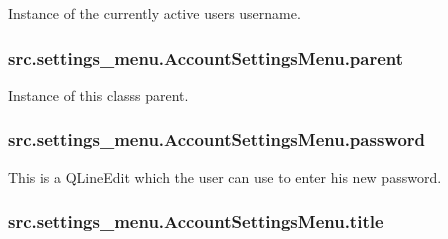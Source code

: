 Instance of the currently active user\textquotesingle{}s username. 

\hypertarget{classsrc_1_1settings__menu_1_1_account_settings_menu_afe50b3829d1054937762620263272c4b}{}
\subsubsection[{parent}]{\setlength{\rightskip}{0pt plus 5cm}src.\+settings\+\_\+menu.\+Account\+Settings\+Menu.\+parent}\label{classsrc_1_1settings__menu_1_1_account_settings_menu_afe50b3829d1054937762620263272c4b}


Instance of this class\textquotesingle{}s parent. 

\hypertarget{classsrc_1_1settings__menu_1_1_account_settings_menu_a11ded2b607c6b7e0b756eef17952b1f6}{}
\subsubsection[{password}]{\setlength{\rightskip}{0pt plus 5cm}src.\+settings\+\_\+menu.\+Account\+Settings\+Menu.\+password}\label{classsrc_1_1settings__menu_1_1_account_settings_menu_a11ded2b607c6b7e0b756eef17952b1f6}


This is a Q\+Line\+Edit which the user can use to enter his new password. 

\hypertarget{classsrc_1_1settings__menu_1_1_account_settings_menu_a6f5f05b647982a9776c96ea5ca254068}{}
\subsubsection[{title}]{\setlength{\rightskip}{0pt plus 5cm}src.\+settings\+\_\+menu.\+Account\+Settings\+Menu.\+title}\label{classsrc_1_1settings__menu_1_1_account_settings_menu_a6f5f05b647982a9776c96ea5ca254068}


